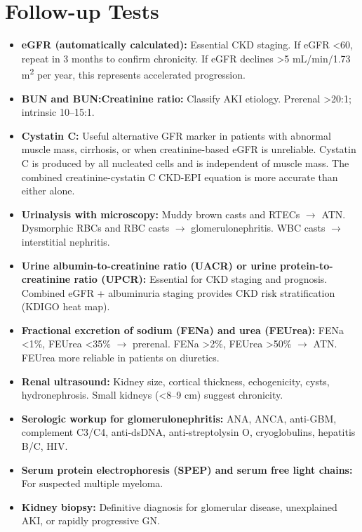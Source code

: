 \section*{Follow-up Tests}
\begin{itemize}
  \item \textbf{eGFR (automatically calculated):} Essential CKD staging. If eGFR <60, repeat in 3 months to confirm chronicity. If eGFR declines >5 mL/min/1.73 m\textsuperscript{2} per year, this represents accelerated progression.
  \item \textbf{BUN and BUN:Creatinine ratio:} Classify AKI etiology. Prerenal >20:1; intrinsic 10--15:1.
  \item \textbf{Cystatin C:} Useful alternative GFR marker in patients with abnormal muscle mass, cirrhosis, or when creatinine-based eGFR is unreliable. Cystatin C is produced by all nucleated cells and is independent of muscle mass. The combined creatinine-cystatin C CKD-EPI equation is more accurate than either alone.
  \item \textbf{Urinalysis with microscopy:} Muddy brown casts and RTECs $\rightarrow$ ATN. Dysmorphic RBCs and RBC casts $\rightarrow$ glomerulonephritis. WBC casts $\rightarrow$ interstitial nephritis.
  \item \textbf{Urine albumin-to-creatinine ratio (UACR) or urine protein-to-creatinine ratio (UPCR):} Essential for CKD staging and prognosis. Combined eGFR + albuminuria staging provides CKD risk stratification (KDIGO heat map).
  \item \textbf{Fractional excretion of sodium (FENa) and urea (FEUrea):} FENa <1\%, FEUrea <35\% $\rightarrow$ prerenal. FENa >2\%, FEUrea >50\% $\rightarrow$ ATN. FEUrea more reliable in patients on diuretics.
  \item \textbf{Renal ultrasound:} Kidney size, cortical thickness, echogenicity, cysts, hydronephrosis. Small kidneys (<8--9 cm) suggest chronicity.
  \item \textbf{Serologic workup for glomerulonephritis:} ANA, ANCA, anti-GBM, complement C3/C4, anti-dsDNA, anti-streptolysin O, cryoglobulins, hepatitis B/C, HIV.
  \item \textbf{Serum protein electrophoresis (SPEP) and serum free light chains:} For suspected multiple myeloma.
  \item \textbf{Kidney biopsy:} Definitive diagnosis for glomerular disease, unexplained AKI, or rapidly progressive GN.
\end{itemize}

